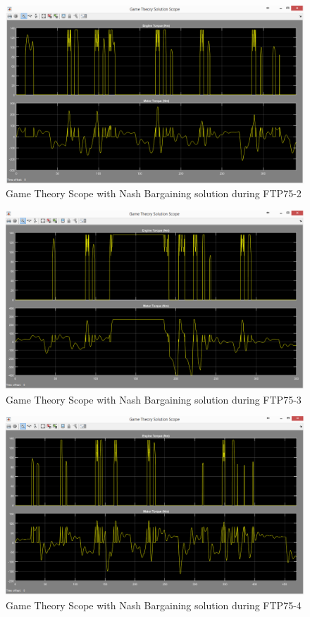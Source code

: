 \begin{figure}[h]
\centering
\includegraphics[scale=0.4]{figures/NashSolution/FTP75-2/gameTheory19Juni}
\caption{Game Theory Scope with Nash Bargaining solution during FTP75-2}
\label{fig:gtns2}
\end{figure}

\begin{figure}[h]
\centering
\includegraphics[scale=0.4]{figures/NashSolution/FTP75-3/gameTheory20Juni}
\caption{Game Theory Scope with Nash Bargaining solution during FTP75-3}
\label{fig:gtns3}
\end{figure}

\begin{figure}[h]
\centering
\includegraphics[scale=0.4]{figures/NashSolution/FTP75-4/gameTheory21Juni}
\caption{Game Theory Scope with Nash Bargaining solution during FTP75-4}
\label{fig:gtns4}
\end{figure}

